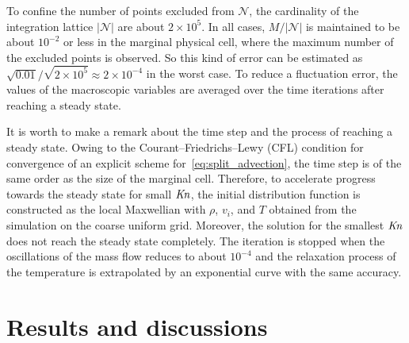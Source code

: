 \documentclass[]{jfm}
\newcommand{\Kn}{\mbox{\textit{Kn}}}
\newcommand{\Nu}{\mathcal{N}}
\begin{document}
To confine the number of points excluded from \(\Nu\),
the cardinality of the integration lattice \(|\Nu|\) are about \(2\times10^5\).
In all cases, \(M/|\mathcal{N}|\) is maintained to be about \(10^{-2}\) or less in the marginal physical cell,
where the maximum number of the excluded points is observed.
So this kind of error can be estimated as \(\sqrt{0.01}/\sqrt{2\times10^5} \approx 2\times10^{-4}\) in the worst case.
To reduce a fluctuation error, the values of the macroscopic variables
are averaged over the time iterations after reaching a steady state.

It is worth to make a remark about the time step and the process of reaching a steady state.
Owing to the Courant--Friedrichs--Lewy (CFL) condition for convergence of an explicit scheme for~\eqref{eq:split_advection},
the time step is of the same order as the size of the marginal cell.
Therefore, to accelerate progress towards the steady state for small \(\Kn\),
the initial distribution function is constructed as the local Maxwellian
with \(\rho\), \(v_i\), and \(T\) obtained from the simulation on the coarse uniform grid.
Moreover, the solution for the smallest \(\Kn\) does not reach the steady state completely.
The iteration is stopped when the oscillations of the mass flow reduces to about \(10^{-4}\)
and the relaxation process of the temperature is extrapolated by an exponential curve with the same accuracy.

\section{Results and discussions}
\end{document}
